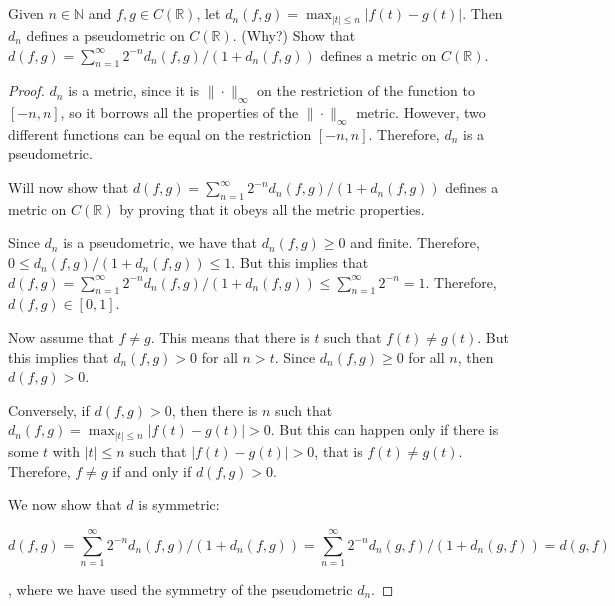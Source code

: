 \subsection{} Given $n \in \mathbb{N}$ and $f, g \in C(\mathbb{R})$, let $d_n(f, g) = \max_{|t|\leq n} |f(t) -  g(t)|$. Then $d_n$ defines a pseudometric on $C(\mathbb{R})$. (Why?) Show that $d(f, g) = \sum_{n=1}^\infty 2^{-n}d_n(f, g)/ ( 1 + d_n(f, g))$ defines a metric  on $C(\mathbb{R})$. 


\begin{proof}
$d_n$ is a metric, since it is $\| \cdot \|_\infty$ on the restriction of the function to $[-n, n]$, so it borrows all the properties of the  $\| \cdot \|_\infty$ metric. However, two different functions can be equal on the restriction $[-n, n]$. Therefore, $d_n$ is a pseudometric.

\vspace{1em}

Will now show that $d(f, g) = \sum_{n=1}^\infty 2^{-n}d_n(f, g) / ( 1 + d_n(f, g))$ defines a metric on $C(\mathbb{R})$ by proving that it obeys all the metric properties.

\vspace{0.5em}

Since $d_n$ is a pseudometric, we have that $d_n(f,g)\geq 0$ and finite. Therefore, $0 \leq d_n(f, g) / ( 1 + d_n(f, g)) \leq 1$. But this implies that $d(f, g) = \sum_{n=1}^\infty 2^{-n}d_n(f, g) / ( 1 + d_n(f, g)) \leq \sum_{n=1}^\infty 2^{-n} = 1$. Therefore, $d(f,g) \in [0,1]$.

\vspace{1em}

Now assume that $f \neq g$. This means that there is $t$ such that $f(t) \neq g(t)$. But this implies that $d_n(f,g) > 0 $ for all $n>t$. Since $d_n(f,g) \geq 0$ for all $n$, then $d(f,g) > 0$. 

Conversely, if $d(f,g) > 0$, then there is $n$ such that $d_n(f,g) = \max_{|t|\leq n} |f(t) -  g(t)| > 0$. But this can happen only if there is some $t$ with $|t| \leq n$ such that $|f(t) - g(t)| > 0$, that is $f(t) \neq g(t)$. Therefore, $f \neq g$ if and only if $d(f,g) > 0$.

\vspace{1em}

We now show that $d$ is symmetric:

$$d(f,g) = \sum_{n=1}^\infty 2^{-n}d_n(f, g) / ( 1 + d_n(f, g)) = \sum_{n=1}^\infty 2^{-n}d_n(g, f) / ( 1 + d_n(g, f)) = d(g,f)$$

, where we have used the symmetry of the pseudometric $d_n$.


\end{proof}
